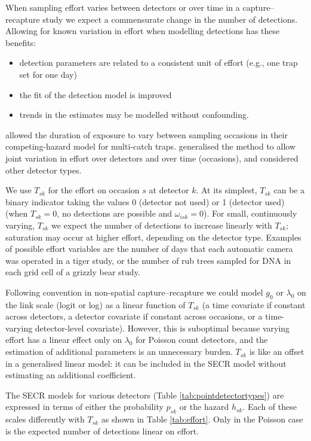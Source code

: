 \documentclass[
]{book}
\providecommand{\tightlist}{%
  \setlength{\itemsep}{0pt}\setlength{\parskip}{0pt}}
\begin{document}

When sampling effort varies between detectors or over time in a capture--recapture study we expect a commensurate change in the number of detections. Allowing for known variation in effort when modelling detections has these benefits:

\begin{itemize}
\tightlist
\item
  detection parameters are related to a consistent unit of effort (e.g., one trap set for one day)
\item
  the fit of the detection model is improved
\item
  trends in the estimates may be modelled without confounding.
\end{itemize}

\citet{be08} allowed the duration of exposure to vary between sampling occasions in their competing-hazard model for
multi-catch traps. \citet{ebm13} generalised the method to allow joint variation in effort over detectors and over time
(occasions), and considered other detector types.

We use \(T_{sk}\) for the effort on occasion \(s\) at detector \(k\). At its simplest, \(T_{sk}\) can be a binary indicator taking the values 0 (detector not used) or 1 (detector used) (when \(T_{sk} = 0\), no detections are possible and \(\omega_{isk} = 0\)). For small, continuously varying, \(T_{sk}\) we expect the number of detections to increase linearly with \(T_{sk}\); saturation may occur at higher effort, depending on the detector type. Examples of possible effort variables are the number of days that each automatic camera was operated in a tiger study, or the number of rub trees sampled for DNA in each grid cell of a grizzly bear study.

Following convention in non-spatial capture--recapture \citep{cw} we could model \(g_0\) or \(\lambda_0\) on the link scale (logit or log) as a linear function of \(T_{sk}\) (a time covariate if constant across detectors, a detector covariate if constant across occasions, or a time-varying detector-level covariate). However, this is suboptimal because varying effort has a linear effect only on \(\lambda_0\) for Poisson count detectors, and the estimation of additional parameters is an unnecessary burden. \(T_{sk}\) is like an offset in a generalised linear model: it can be included in the SECR model without estimating an additional coefficient.

The SECR models for various detectors (Table \ref{tab:pointdetectortypes}) are expressed in terms of either the probability \(p_{sk}\) or the hazard \(h_{sk}\). Each of these scales differently with \(T_{sk}\) as shown in Table \ref{tab:effort}. Only in the Poisson case is the expected number of detections linear on effort.
\end{document}
